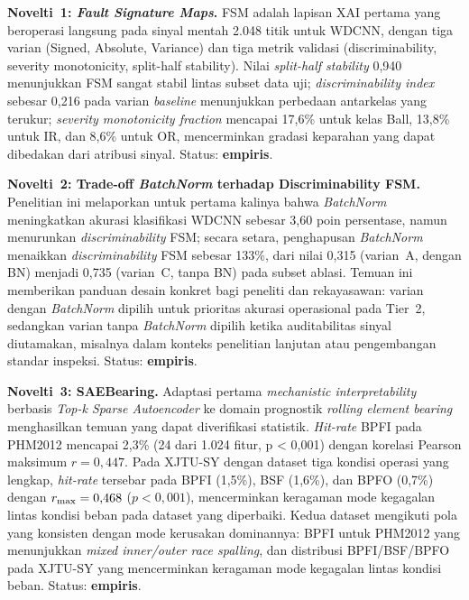 \textbf{Novelti~1: \emph{Fault Signature Maps}.} FSM adalah lapisan XAI
pertama yang beroperasi langsung pada sinyal mentah 2.048 titik untuk WDCNN,
dengan tiga varian (Signed, Absolute, Variance) dan tiga metrik validasi
(discriminability, severity monotonicity, split-half stability). Nilai
\emph{split-half stability} 0,940 menunjukkan FSM sangat stabil lintas subset
data uji; \emph{discriminability index} sebesar 0,216 pada varian \emph{baseline}
menunjukkan perbedaan antarkelas yang terukur; \emph{severity monotonicity
fraction} mencapai 17,6\% untuk kelas Ball, 13,8\% untuk IR, dan 8,6\% untuk
OR, mencerminkan gradasi keparahan yang dapat dibedakan dari atribusi sinyal.
Status: \textbf{empiris}.

\textbf{Novelti~2: Trade-off \emph{BatchNorm} terhadap Discriminability FSM.}
Penelitian ini melaporkan untuk pertama kalinya bahwa \emph{BatchNorm}
meningkatkan akurasi klasifikasi WDCNN sebesar 3,60 poin persentase, namun
{\color{blue}menurunkan \emph{discriminability} FSM; secara setara,
penghapusan \emph{BatchNorm} menaikkan \emph{discriminability} FSM sebesar 133\%,
dari nilai 0,315 (varian~A, dengan BN) menjadi 0,735 (varian~C, tanpa BN) pada
subset ablasi}. Temuan ini memberikan panduan
desain konkret bagi peneliti dan rekayasawan: varian dengan \emph{BatchNorm}
dipilih untuk prioritas akurasi operasional pada Tier~2, sedangkan varian tanpa
\emph{BatchNorm} dipilih ketika auditabilitas sinyal diutamakan, misalnya dalam
konteks penelitian lanjutan atau pengembangan standar inspeksi.
Status: \textbf{empiris}.

\textbf{Novelti~3: SAEBearing.} Adaptasi pertama \emph{mechanistic
interpretability} berbasis \emph{Top-k Sparse Autoencoder} ke domain prognostik
\emph{rolling element bearing} menghasilkan temuan yang dapat diverifikasi statistik.
\emph{Hit-rate} BPFI pada PHM2012 mencapai 2,3\% (24 dari 1.024 fitur, p <
0,001) dengan korelasi Pearson maksimum $r = 0{,}447$. {\color{blue}Pada XJTU-SY
dengan dataset tiga kondisi operasi yang lengkap, \emph{hit-rate} tersebar pada
BPFI (1{,}5\%), BSF (1{,}6\%), dan BPFO (0{,}7\%) dengan $r_{\rm max} = 0{,}468$
($p < 0{,}001$), mencerminkan keragaman mode kegagalan lintas kondisi beban
pada dataset yang diperbaiki.}
Kedua dataset mengikuti pola yang konsisten dengan mode kerusakan dominannya:
BPFI untuk PHM2012 yang menunjukkan \emph{mixed inner/outer race spalling}, dan
{\color{blue}distribusi BPFI/BSF/BPFO pada XJTU-SY yang mencerminkan keragaman mode
kegagalan lintas kondisi beban.}
Status: \textbf{empiris}.

